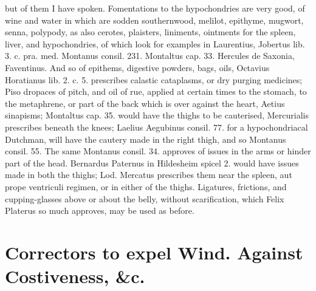 but of them I have spoken. Fomentations to the hypochondries are very
good, of wine and water in which are sodden southernwood, melilot,
epithyme, mugwort, senna, polypody, as also cerotes,
plaisters, liniments, ointments for the spleen, liver, and
hypochondries, of which look for examples in Laurentius, Jobertus lib.
3. c. pra. med. Montanus consil. 231. Montaltus cap. 33. Hercules de
Saxonia, Faventinus. And so of epithems, digestive powders, bags, oils,
Octavius Horatianus lib. 2. c. 5. prescribes calastic cataplasms, or
dry purging medicines; Piso dropaces of pitch, and oil of rue,
applied at certain times to the stomach, to the metaphrene, or part of
the back which is over against the heart, Aetius sinapisms; Montaltus
cap. 35. would have the thighs to be cauterised, Mercurialis
prescribes beneath the knees; Laelius Aegubinus consil. 77. for a
hypochondriacal Dutchman, will have the cautery made in the right
thigh, and so Montanus consil. 55. The same Montanus consil. 34.
approves of issues in the arms or hinder part of the head. Bernardus
Paternus in Hildesheim spicel 2. would have  issues made in both
the thighs; Lod. Mercatus prescribes them near the spleen, aut
prope ventriculi regimen, or in either of the thighs. Ligatures,
frictions, and cupping-glasses above or about the belly, without
scarification, which Felix Platerus so much approves, may be used
as before.

\section[To expel Wind. Against Constipation]{Correctors to expel Wind. Against Costiveness, \&c.}

